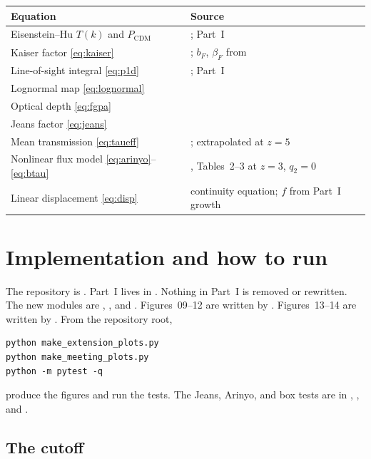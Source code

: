\documentclass[11pt]{article}
\begin{document}
\begin{center}
\small
\begin{tabular}{@{}p{}p{}@{}}
\toprule
Equation & Source \\
\midrule
Eisenstein--Hu $T(k)$ and $P_\mathrm{CDM}$ &
\cite{Eisenstein:1997ik}; Part~I \\
Kaiser factor \eqref{eq:kaiser} &
\cite{Kaiser:1987qv,McDonald:2001fe}; $b_F$, $\beta_F$ from \cite{Gordon:2023dua} \\
Line-of-sight integral \eqref{eq:p1d} &
\cite{McDonald:2001fe}; Part~I \\
Lognormal map \eqref{eq:lognormal} &
\cite{Coles:1991if,Bi:1996fh,Arya:2022uke} \\
Optical depth \eqref{eq:fgpa} &
\cite{Gunn:1965hd,Hui:1997dp} \\
Jeans factor \eqref{eq:jeans} &
\cite{Arya:2022uke} \\
Mean transmission \eqref{eq:taueff} &
\cite{Faucher-Giguere:2007ab}; extrapolated at $z=5$ \\
Nonlinear flux model \eqref{eq:arinyo}--\eqref{eq:btau} &
\cite{Arinyo-i-Prats:2015vqa}, Tables~2--3 at $z=3$, $q_2=0$ \\
Linear displacement \eqref{eq:disp} &
continuity equation; $f$ from Part~I growth \\
\bottomrule
\end{tabular}
\end{center}

\section{Implementation and how to run}
\label{sec:code}

The repository is .
Part~I lives in .
Nothing in Part~I is removed or rewritten.
The new modules are , , and .
Figures~09--12 are written by .
Figures~13--14 are written by .
From the repository root,
\begin{verbatim}
python make_extension_plots.py
python make_meeting_plots.py
python -m pytest -q
\end{verbatim}
produce the figures and run the tests.
The Jeans, Arinyo, and box tests are in , , and .

\subsection{The cutoff}
\end{document}
